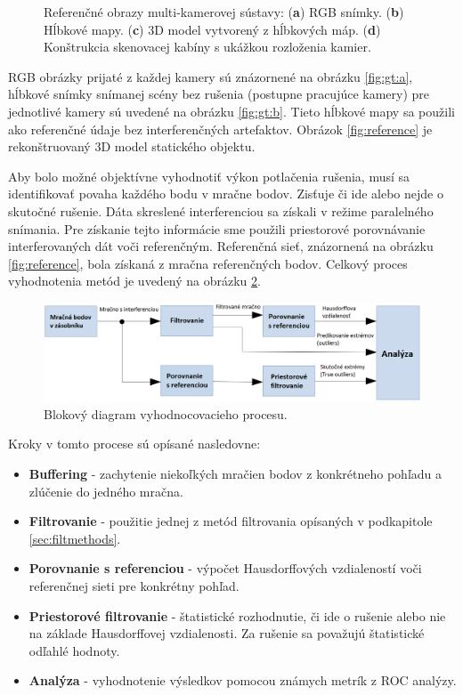 \begin{figure}[H]
	\caption{Referenčné obrazy multi-kamerovej sústavy: (\textbf{a}) RGB snímky. (\textbf{b}) Hĺbkové mapy. (\textbf{c}) 3D model vytvorený z hĺbkových máp. (\textbf{d}) Konštrukcia skenovacej kabíny s ukážkou rozloženia kamier.}
	\label{fig:gt}
\end{figure}

RGB obrázky prijaté z každej kamery sú znázornené na obrázku \ref {fig:gt:a}, hĺbkové snímky snímanej scény bez rušenia (postupne pracujúce kamery) pre jednotlivé kamery sú uvedené na obrázku \ref {fig:gt:b}. Tieto hĺbkové mapy sa použili ako referenčné údaje bez interferenčných artefaktov. Obrázok \ref{fig:reference} je rekonštruovaný 3D model statického objektu.

Aby bolo možné objektívne vyhodnotiť výkon potlačenia rušenia, musí sa identifikovať povaha každého bodu v mračne bodov. Zisťuje či ide alebo nejde o skutočné rušenie. Dáta skreslené interferenciou sa získali v režime paralelného snímania. Pre získanie tejto informácie sme použili priestorové porovnávanie interferovaných dát voči referenčným. Referenčná sieť, znázornená na obrázku \ref {fig:reference}, bola získaná z mračna referenčných bodov. Celkový proces vyhodnotenia metód je uvedený na obrázku \ref{fig:eval}.

\begin{figure}[H]
	\centering
	\includegraphics[width=\textwidth]{figures/eval.png}
	\caption{Blokový diagram vyhodnocovacieho procesu.}
	\label{fig:eval}
\end{figure}

\noindent Kroky v tomto procese sú opísané nasledovne:

\begin{itemize}
\item \textbf{Buffering} - zachytenie niekoľkých mračien bodov z konkrétneho pohľadu a zlúčenie do jedného mračna.
\item \textbf{Filtrovanie} - použitie jednej z metód filtrovania opísaných v podkapitole \ref{sec:filtmethods}.
\item \textbf{Porovnanie s referenciou} - výpočet Hausdorffových vzdialeností voči referenčnej sieti pre konkrétny pohľad.
\item \textbf{Priestorové filtrovanie} - štatistické rozhodnutie, či ide o rušenie alebo nie na základe Hausdorffovej vzdialenosti. Za rušenie sa považujú štatistické odľahlé hodnoty.
\item \textbf{Analýza} - vyhodnotenie výsledkov pomocou známych metrík z ROC analýzy.
\end{itemize}

